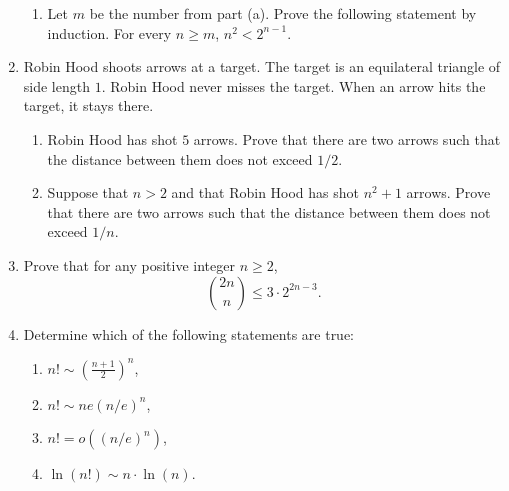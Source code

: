 \documentclass[11pt]{article}
\begin{document}
\begin{enumerate}
\begin{enumerate}
\item Let $m$ be the number from part (a).  Prove the following statement by induction.  For every $n \ge m$, $n^2 < 2^{n-1}$.

\end{enumerate}

\item Robin Hood shoots arrows at a target. The target is an equilateral triangle of side length $1$.  Robin Hood never misses the target.  When an arrow hits the target, it stays there.
\begin{enumerate}
\item Robin Hood has shot $5$ arrows.  Prove that there are two arrows such that the distance between them does not exceed $1/2$.

\item Suppose that $n>2$ and that Robin Hood has shot $n^2+1$ arrows.  Prove that there are two arrows such that the distance between them does not exceed $1/n$.

\end{enumerate}





\item Prove that for any positive integer $n\ge 2$,
\[
\binom{2n}{n} \le 3 \cdot 2^{2n-3}.
\]

\item Determine which of the following statements are true:
\begin{enumerate}
\item $n! \sim \left(\frac{n+1}{2}\right)^n$,
\item $n! \sim ne (n/e)^n$,
\item $n! = o((n/e)^n)$,
\item $\ln(n!) \sim n \cdot \ln(n)$.
\end{enumerate}


\end{enumerate}
\end{document}
